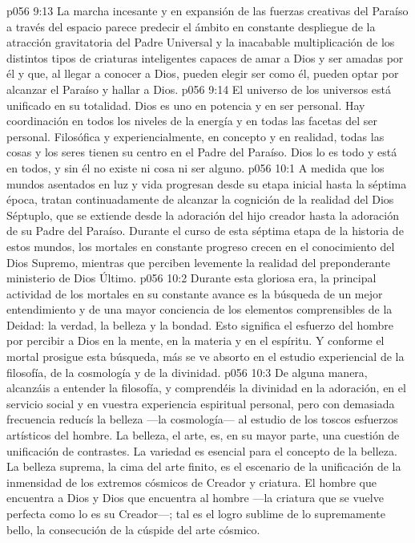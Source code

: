 \vs p056 9:13 La marcha incesante y en expansión de las fuerzas creativas del Paraíso a través del espacio parece predecir el ámbito en constante despliegue de la atracción gravitatoria del Padre Universal y la inacabable multiplicación de los distintos tipos de criaturas inteligentes capaces de amar a Dios y ser amadas por él y que, al llegar a conocer a Dios, pueden elegir ser como él, pueden optar por alcanzar el Paraíso y hallar a Dios.
\vs p056 9:14 El universo de los universos está unificado en su totalidad. Dios es uno en potencia y en ser personal. Hay coordinación en todos los niveles de la energía y en todas las facetas del ser personal. Filosófica y experiencialmente, en concepto y en realidad, todas las cosas y los seres tienen su centro en el Padre del Paraíso. Dios lo es todo y está en todos, y sin él no existe ni cosa ni ser alguno.
\vs p056 10:1 A medida que los mundos asentados en luz y vida progresan desde su etapa inicial hasta la séptima época, tratan continuadamente de alcanzar la cognición de la realidad del Dios Séptuplo, que se extiende desde la adoración del hijo creador hasta la adoración de su Padre del Paraíso. Durante el curso de esta séptima etapa de la historia de estos mundos, los mortales en constante progreso crecen en el conocimiento del Dios Supremo, mientras que perciben levemente la realidad del preponderante ministerio de Dios Último.
\vs p056 10:2 Durante esta gloriosa era, la principal actividad de los mortales en su constante avance es la búsqueda de un mejor entendimiento y de una mayor conciencia de los elementos comprensibles de la Deidad: la verdad, la belleza y la bondad. Esto significa el esfuerzo del hombre por percibir a Dios en la mente, en la materia y en el espíritu. Y conforme el mortal prosigue esta búsqueda, más se ve absorto en el estudio experiencial de la filosofía, de la cosmología y de la divinidad.
\vs p056 10:3 \pc De alguna manera, alcanzáis a entender la filosofía, y comprendéis la divinidad en la adoración, en el servicio social y en vuestra experiencia espiritual personal, pero con demasiada frecuencia reducís la belleza ---la cosmología--- al estudio de los toscos esfuerzos artísticos del hombre. La belleza, el arte, es, en su mayor parte, una cuestión de unificación de contrastes. La variedad es esencial para el concepto de la belleza. La belleza suprema, la cima del arte finito, es el escenario de la unificación de la inmensidad de los extremos cósmicos de Creador y criatura. El hombre que encuentra a Dios y Dios que encuentra al hombre ---la criatura que se vuelve perfecta como lo es su Creador---; tal es el logro sublime de lo supremamente bello, la consecución de la cúspide del arte cósmico.
